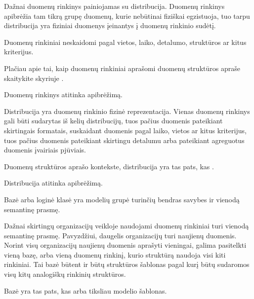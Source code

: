 \documentclass[letterpaper,10pt,lithuanian]{sphinxmanual}
\begin{document}
\begin{description}
\sphinxAtStartPar
Dažnai duomenų rinkinys painiojamas su distribucija. Duomenų rinkinys
apibrėžia tam tikrą grupę duomenų, kurie nebūtinai fiziškai egzistuoja,
tuo tarpu distribucija yra fiziniai duomenys įeinantys į duomenų
rinkinio sudėtį.

\sphinxAtStartPar
Duomenų rinkiniai neskaidomi pagal vietos, laiko, detalumo, struktūros
ar kitus kriterijus.

\sphinxAtStartPar
Plačiau apie tai, kaip duomenų rinkiniai aprašomi duomenų struktūros
apraše skaitykite skyriuje {\hyperref[\detokenize{dimensijos:dataset}]{}}.

\sphinxAtStartPar
Duomenų rinkinys atitinka  apibrėžimą.

\sphinxAtStartPar
Distribucija yra duomenų rinkinio fizinė reprezentacija. Vienas duomenų
rinkinys gali būti sudarytas iš kelių distribucijų, tuos pačius duomenis
pateikiant skirtingais formatais, suskaidant duomenis pagal laiko,
vietos ar kitus kriterijus, tuos pačius duomenis pateikiant skirtingu
detalumu arba pateikiant agreguotus duomenis įvairiais pjūviais.

\sphinxAtStartPar
Duomenų struktūros aprašo kontekste, distribucija yra tas pats, kas
.

\sphinxAtStartPar
Distribucija atitinka  apibrėžimą.

\sphinxAtStartPar
Bazė arba loginė klasė yra modelių grupė turinčių bendras savybes ir
vienodą semantinę prasmę.

\sphinxAtStartPar
Dažnai skirtingų organizacijų veikloje naudojami duomenų rinkiniai turi
vienodą semantinę prasmę. Pavyzdžiui, daugelis organizacijų turi
naujienų duomenis. Norint visų organizacijų naujienų duomenis
aprašyti vieningai, galima pasitelkti vieną bazę, arba vieną duomenų
rinkinį, kurio struktūrą naudoja visi kiti rinkiniai. Tai bazė būtent
ir būtų struktūros šablonas pagal kurį būtų sudaromos visų kitų
analogiškų rinkinių struktūros.

\sphinxAtStartPar
Bazė yra tas pats, kas {\hyperref[\detokenize{savokos:term-modelis}]{}} arba tiksliau modelio šablonas.


\end{description}
\end{document}
